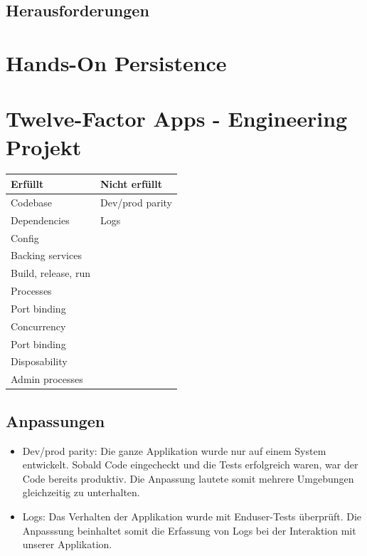 \documentclass[12pt,a4paper]{article}
\begin{document}
\subsection{Herausforderungen}
\section{Hands-On Persistence}


\section{Twelve-Factor Apps - Engineering Projekt}
    \begin{table}[H]
        \begin{tabular}{ll}
        \hline
        \textbf{Erfüllt}      & \textbf{Nicht erfüllt}     \\ \hline
        Codebase              & Dev/prod parity            \\ \hline
        Dependencies          & Logs                       \\
        Config                &                            \\
        Backing services      &                            \\
        Build, release, run   &                            \\
        Processes             &                            \\
        Port binding          &                            \\
        Concurrency           &                            \\
        Port binding          &                            \\
        Disposability         &                            \\
        Admin processes       &                            \\ \hline
        \end{tabular}
    \end{table}

\subsection{Anpassungen}
    \begin{itemize}
        \item Dev/prod parity: Die ganze Applikation wurde nur auf einem System entwickelt. Sobald Code eingecheckt und die Tests
              erfolgreich waren, war der Code bereits produktiv. Die Anpassung lautete somit mehrere Umgebungen gleichzeitig zu
              unterhalten.
        \item Logs: Das Verhalten der Applikation wurde mit Enduser-Tests überprüft. Die Anpasssung beinhaltet somit die Erfassung
              von Logs bei der Interaktion mit unserer Applikation.
    \end{itemize}
\end{document}
